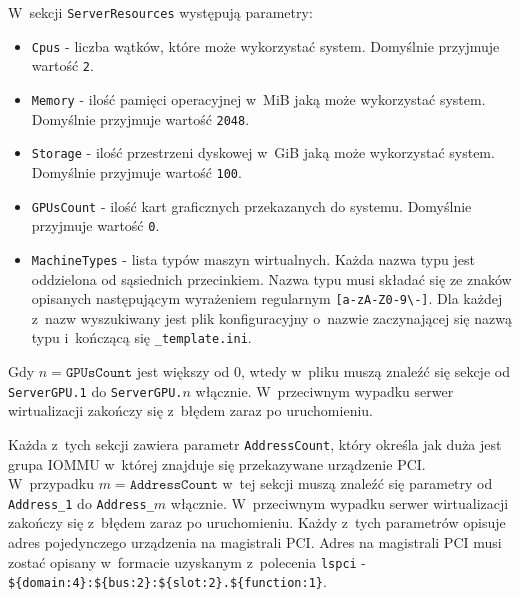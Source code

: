 \documentclass[../opis-rozwiazania.tex]{subfiles}
\begin{document}
W~sekcji \texttt{ServerResources} występują parametry:
\begin{itemize}
  \item \texttt{Cpus} - liczba wątków, które może wykorzystać system. Domyślnie przyjmuje wartość \texttt{2}.
  \item \texttt{Memory} - ilość pamięci operacyjnej w~MiB jaką może wykorzystać system. Domyślnie przyjmuje wartość \texttt{2048}.
  \item \texttt{Storage} - ilość przestrzeni dyskowej w~GiB jaką może wykorzystać system. Domyślnie przyjmuje wartość \texttt{100}.
  \item \texttt{GPUsCount} - ilość kart graficznych przekazanych do systemu. Domyślnie przyjmuje wartość \texttt{0}.
  \item \texttt{MachineTypes} - lista typów maszyn wirtualnych. Każda nazwa typu jest oddzielona od sąsiednich przecinkiem. Nazwa typu musi składać się ze znaków opisanych następującym wyrażeniem regularnym \texttt{[a-zA-Z0-9\textbackslash-]}. Dla każdej z~nazw wyszukiwany jest plik konfiguracyjny o~nazwie zaczynającej się nazwą typu i~kończącą się \texttt{\_template.ini}.
\end{itemize}

Gdy $n = \texttt{GPUsCount}$ jest większy od 0, wtedy w~pliku muszą znaleźć się sekcje od \texttt{ServerGPU.1} do \texttt{ServerGPU.$n$} włącznie.
W~przeciwnym wypadku serwer wirtualizacji zakończy się z~błędem zaraz po uruchomieniu.

Każda z~tych sekcji zawiera parametr \texttt{AddressCount}, który określa jak duża jest grupa IOMMU w~której znajduje się przekazywane urządzenie PCI.
W~przypadku $m = \texttt{AddressCount}$ w~tej sekcji muszą znaleźć się parametry od \texttt{Address\_1} do \texttt{Address\_$m$} włącznie.
W~przeciwnym wypadku serwer wirtualizacji zakończy się z~błędem zaraz po uruchomieniu.
Każdy z~tych parametrów opisuje adres pojedynczego urządzenia na magistrali PCI.
Adres na magistrali PCI musi zostać opisany w~formacie uzyskanym z~polecenia \texttt{lspci} - \texttt{\$\{domain:4\}:\$\{bus:2\}:\$\{slot:2\}.\$\{function:1\}}.
\end{document}
